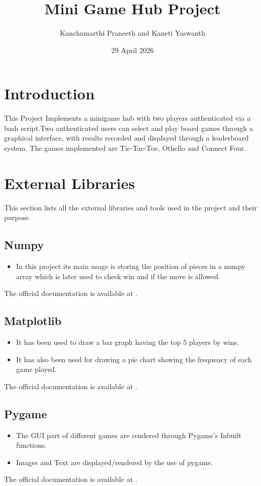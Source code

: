 \documentclass[12pt,a4paper]{article}
\title{\textbf{Mini Game Hub Project}}
\author{Kanchumarthi Praneeth and Kaneti Yaswanth}
\date{29 April 2026}
\begin{document}
\sloppy
\maketitle
\tableofcontents
\newpage


\section{Introduction}
This Project Implements a minigame hub with two players authenticated via a bash script.Two authenticated users can select and play board games through a graphical interface, with results recorded and displayed through a leaderboard system. The games implemented are Tic-Tac-Toe, Othello and Connect Four.


\section{External Libraries}
\label{sec:libraries}

This section lists all the external libraries and tools used in the project and their purpose.

\subsection{Numpy}
\begin{itemize}
    \item In this project its main usage is storing the position of pieces in a numpy array which is later used to check win and if the move is allowed.
\end{itemize}
The official documentation is available at \cite{numpy_docs}.

\subsection{Matplotlib}
\begin{itemize}
    \item It has been used to draw a bar graph having the top 5 players by wins.
    \item It has also been used for drawing a pie chart showing the frequency of each game played.
\end{itemize}
The official documentation is available at \cite{matplotlib_docs}.

\subsection{Pygame}
\begin{itemize}
    \item The GUI part of different games are rendered through Pygame's Inbuilt functions.
    \item Images and Text are displayed/rendered by the use of pygame.
\end{itemize}
The official documentation is available at \cite{pygame_docs}.
\end{document}
